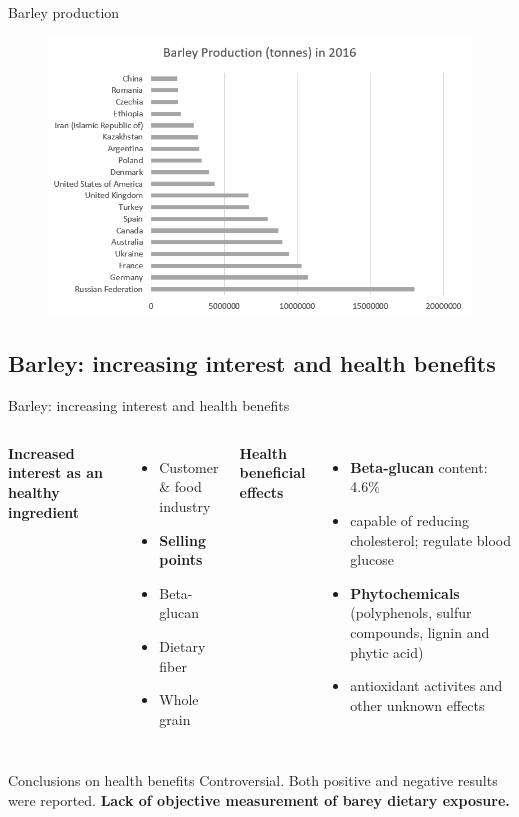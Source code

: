 \documentclass{beamer}
\begin{document}
\begin{frame}{Barley production}
\begin{figure}[h]
    \centering
    \includegraphics[scale=0.6]{images/barley_production.png}
\end{figure}
\end{frame}

\subsection{Barley: increasing interest and health benefits}
\begin{frame}{Barley: increasing interest and health benefits}
\begin{columns}[T] 
\textbf{Increased interest as an healthy ingredient}
\begin{itemize}
\item Customer \& food industry
\newline
\item \textbf{Selling points}
\item Beta-glucan
\item Dietary fiber
\item Whole grain
\end{itemize}
 
\textbf{Health beneficial effects}
\begin{itemize}
\item \textbf{Beta-glucan} content: 4.6\%
\item capable of reducing cholesterol; regulate blood glucose
\item \textbf{Phytochemicals} (polyphenols, sulfur compounds, lignin and phytic acid)
\item antioxidant activites and  other unknown effects
\end{itemize}
\end{columns}
\vskip 0.3cm

\begin{block}{Conclusions on health benefits}
Controversial. Both positive and negative results were reported.
\textbf{Lack of objective measurement of barey dietary exposure.}
\end{block}
\end{frame}
\end{document}
